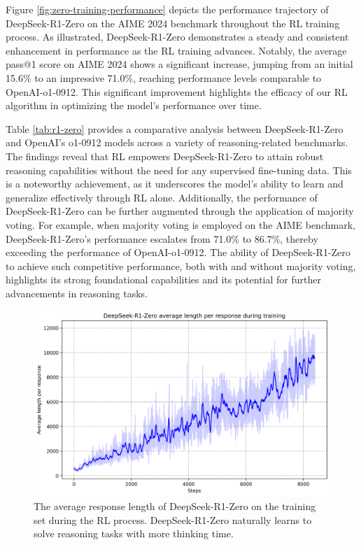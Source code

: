 \documentclass[11pt, a4paper, logo, copyright, nonumbering]{deepseek}
\newcommand{\dsro}{DeepSeek-R1-Zero}
\begin{document}
Figure \ref{fig:zero-training-performance} depicts the performance trajectory of \dsro{} on the AIME 2024 benchmark throughout the RL training process. As illustrated, \dsro{} demonstrates a steady and consistent enhancement in performance as the RL training advances. Notably, the average pass@1 score on AIME 2024 shows a significant increase, jumping from an initial 15.6\% to an impressive 71.0\%, reaching performance levels comparable to OpenAI-o1-0912. This significant improvement highlights the efficacy of our RL algorithm in optimizing the model's performance over time.

Table \ref{tab:r1-zero} provides a comparative analysis between \dsro{} and OpenAI's o1-0912 models across a variety of reasoning-related benchmarks. The findings reveal that RL empowers \dsro{} to attain robust reasoning capabilities without the need for any supervised fine-tuning data.
This is a noteworthy achievement, as it underscores the model's ability to learn and generalize effectively through RL alone. Additionally, the performance of \dsro{} can be further augmented through the application of majority voting. For example, when majority voting is employed on the AIME benchmark, \dsro{}'s performance escalates from 71.0\% to 86.7\%, thereby exceeding the performance of OpenAI-o1-0912. 
The ability of \dsro{} to achieve such competitive performance, both with and without majority voting, highlights its strong foundational capabilities and its potential for further advancements in reasoning tasks.

\begin{figure}[t]
    \centering
    \includegraphics[width=0.75\linewidth]{figures/plot_length.png}
    \caption{The average response length of \dsro{} on the training set during the RL process. \dsro{} naturally learns to solve reasoning tasks with more thinking time.}
    \label{fig:zero-training-length}
\end{figure}
\end{document}
